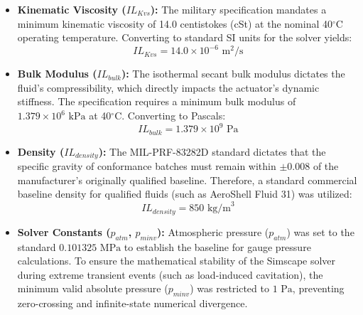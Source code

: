 \documentclass[
bindingoffset=5mm,  %
footnoteindent=3mm, %
hyphenation=true    %
]{src/wut-thesis}
\begin{document}
	\begin{itemize}
		\item \textbf{Kinematic Viscosity ($IL_{Kvs}$):} The military specification mandates a minimum kinematic viscosity of 14.0 centistokes (cSt) at the nominal 40$^\circ$C operating temperature. Converting to standard SI units for the solver yields:
		$$IL_{Kvs} = 14.0 \times 10^{-6} \text{ m}^2/\text{s}$$
		
		\item \textbf{Bulk Modulus ($IL_{bulk}$):} The isothermal secant bulk modulus dictates the fluid's compressibility, which directly impacts the actuator's dynamic stiffness. The specification requires a minimum bulk modulus of $1.379 \times 10^6 \text{ kPa}$ at 40$^\circ$C. Converting to Pascals:
		$$IL_{bulk} = 1.379 \times 10^9 \text{ Pa}$$
		
		\item \textbf{Density ($IL_{density}$):} The MIL-PRF-83282D standard dictates that the specific gravity of conformance batches must remain within $\pm 0.008$ of the manufacturer's originally qualified baseline. Therefore, a standard commercial baseline density for qualified fluids (such as AeroShell Fluid 31) was utilized:
		$$IL_{density} = 850 \text{ kg/m}^3$$
		
		\item \textbf{Solver Constants ($p_{atm}$, $p_{minv}$):} Atmospheric pressure ($p_{atm}$) was set to the standard $0.101325 \text{ MPa}$ to establish the baseline for gauge pressure calculations. To ensure the mathematical stability of the Simscape solver during extreme transient events (such as load-induced cavitation), the minimum valid absolute pressure ($p_{minv}$) was restricted to $1 \text{ Pa}$, preventing zero-crossing and infinite-state numerical divergence.
	\end{itemize}
	
	\newpage
	\printbibliography
	
\end{document}

